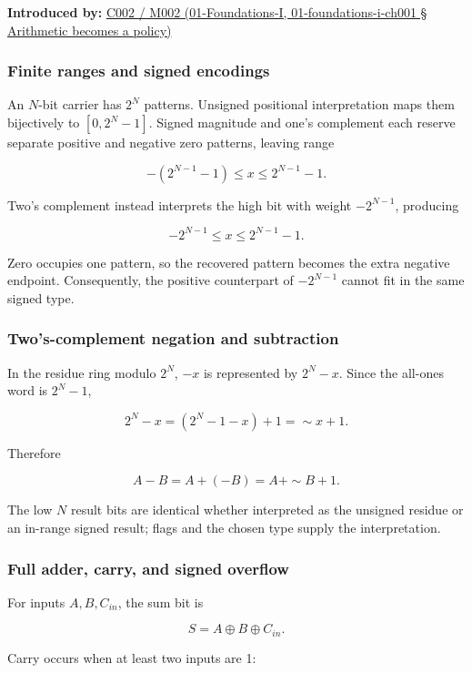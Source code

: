 \textbf{Introduced by:} \href{}{C002 / M002 (01-Foundations-I, 01-foundations-i-ch001 § Arithmetic becomes a policy)}

\subsubsection{Finite ranges and signed encodings}\label{finite-ranges-and-signed-encodings}

An \(N\)-bit carrier has \(2^N\) patterns. Unsigned positional interpretation maps them bijectively to \([0,2^N-1]\). Signed magnitude and one's complement each reserve separate positive and negative zero patterns, leaving range

\[
-(2^{N-1}-1)\le x\le2^{N-1}-1.
\]

Two's complement instead interprets the high bit with weight \(-2^{N-1}\), producing

\[
-2^{N-1}\le x\le2^{N-1}-1.
\]

Zero occupies one pattern, so the recovered pattern becomes the extra negative endpoint. Consequently, the positive counterpart of \(-2^{N-1}\) cannot fit in the same signed type.

\subsubsection{Two's-complement negation and subtraction}\label{twos-complement-negation-and-subtraction}

In the residue ring modulo \(2^N\), \(-x\) is represented by \(2^N-x\). Since the all-ones word is \(2^N-1\),

\[
2^N-x=(2^N-1-x)+1=\sim x+1.
\]

Therefore

\[
A-B=A+(-B)=A+\sim B+1.
\]

The low \(N\) result bits are identical whether interpreted as the unsigned residue or an in-range signed result; flags and the chosen type supply the interpretation.

\subsubsection{Full adder, carry, and signed overflow}\label{full-adder-carry-and-signed-overflow}

For inputs \(A,B,C_{in}\), the sum bit is

\[
S=A\oplus B\oplus C_{in}.
\]

Carry occurs when at least two inputs are 1:

